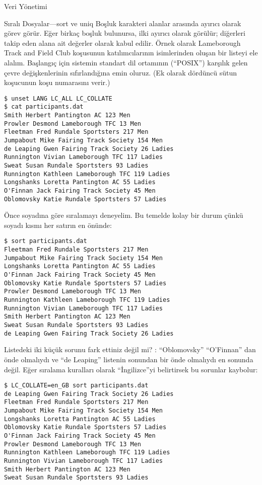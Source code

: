 \begin{section}{Veri Yönetimi}
\begin{subsection}{Sıralı Dosyalar—sort ve uniq}
Boşluk karakteri alanlar arasında ayırıcı olarak görev görür. Eğer birkaç boşluk bulunursa, ilki ayırıcı olarak görülür; diğerleri takip eden alana ait değerler olarak kabul edilir. Örnek olarak Lameborough Track and Field Club  koşusunun katılımcılarının isimlerinden oluşan bir listeyi ele alalım. Başlangıç için  sistemin standart dil ortamının (“POSIX”) karşılık gelen çevre değişkenlerinin sıfırlandığına emin oluruz. (Ek olarak dördüncü sütun koşucunun koşu numarasını verir.)  
\begin{verbatim}
$ unset LANG LC_ALL LC_COLLATE
$ cat participants.dat
Smith Herbert Pantington AC 123 Men
Prowler Desmond Lameborough TFC 13 Men
Fleetman Fred Rundale Sportsters 217 Men
Jumpabout Mike Fairing Track Society 154 Men
de Leaping Gwen Fairing Track Society 26 Ladies
Runnington Vivian Lameborough TFC 117 Ladies
Sweat Susan Rundale Sportsters 93 Ladies
Runnington Kathleen Lameborough TFC 119 Ladies
Longshanks Loretta Pantington AC 55 Ladies
O'Finnan Jack Fairing Track Society 45 Men
Oblomovsky Katie Rundale Sportsters 57 Ladies
\end{verbatim}

Önce soyadına göre sıralamayı deneyelim. Bu temelde kolay bir durum çünkü soyadı kısmı her satırın en önünde:
\begin{verbatim}
$ sort participants.dat
Fleetman Fred Rundale Sportsters 217 Men
Jumpabout Mike Fairing Track Society 154 Men
Longshanks Loretta Pantington AC 55 Ladies
O'Finnan Jack Fairing Track Society 45 Men
Oblomovsky Katie Rundale Sportsters 57 Ladies
Prowler Desmond Lameborough TFC 13 Men
Runnington Kathleen Lameborough TFC 119 Ladies
Runnington Vivian Lameborough TFC 117 Ladies
Smith Herbert Pantington AC 123 Men
Sweat Susan Rundale Sportsters 93 Ladies
de Leaping Gwen Fairing Track Society 26 Ladies
\end{verbatim}

Listedeki iki küçük sorunu fark ettiniz değil mi? : “Oblomovsky” “O’Finnan” dan önde olmalıydı ve “de Leaping” listenin sonundan bir önde olmalıydı en sonunda değil.  Eğer sıralama kuralları olarak “İngilizce”yi belirtirsek bu sorunlar kaybolur:
\begin{verbatim}
$ LC_COLLATE=en_GB sort participants.dat
de Leaping Gwen Fairing Track Society 26 Ladies
Fleetman Fred Rundale Sportsters 217 Men
Jumpabout Mike Fairing Track Society 154 Men
Longshanks Loretta Pantington AC 55 Ladies
Oblomovsky Katie Rundale Sportsters 57 Ladies
O'Finnan Jack Fairing Track Society 45 Men
Prowler Desmond Lameborough TFC 13 Men
Runnington Kathleen Lameborough TFC 119 Ladies
Runnington Vivian Lameborough TFC 117 Ladies
Smith Herbert Pantington AC 123 Men
Sweat Susan Rundale Sportsters 93 Ladies
\end{verbatim}


\end{subsection}
\end{section}
